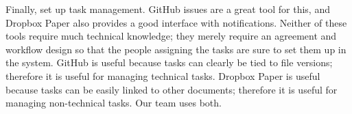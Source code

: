 Finally, set up task management. GitHub issues are a great tool for this,
and Dropbox Paper also provides a good interface with notifications.
Neither of these tools require much technical knowledge;
they merely require an agreement and workflow design
so that the people assigning the tasks
are sure to set them up in the system.
GitHub is useful because tasks can clearly be tied to file versions;
therefore it is useful for managing technical tasks.
Dropbox Paper is useful because tasks can be easily linked to other documents;
therefore it is useful for managing non-technical tasks.
Our team uses both.
